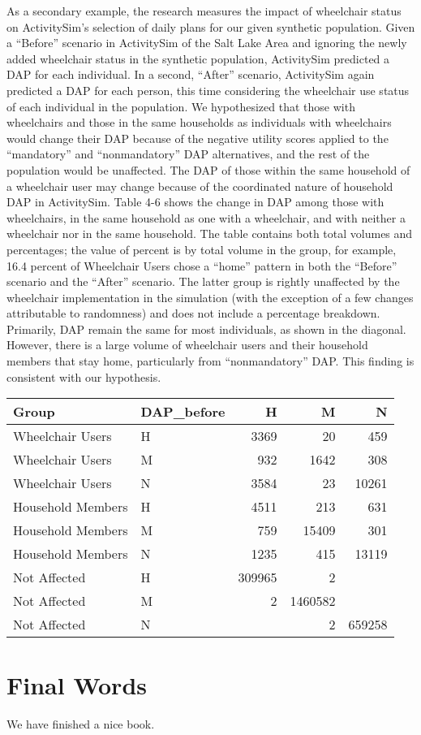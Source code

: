 \documentclass[3p, authoryear, review]{elsarticle} %
\begin{document}
As a secondary example, the research measures the impact of
wheelchair status on ActivitySim's selection of daily plans for our given
synthetic population. Given a ``Before'' scenario in ActivitySim of the Salt Lake
Area and ignoring the newly added wheelchair status in the synthetic population,
ActivitySim predicted a DAP for each individual. In a second, ``After'' scenario,
ActivitySim again predicted a DAP for each person, this time considering the
wheelchair use status of each individual in the population. We hypothesized that
those with wheelchairs and those in the same households as individuals with
wheelchairs would change their DAP because of the negative utility scores
applied to the ``mandatory'' and ``nonmandatory'' DAP alternatives, and the rest of
the population would be unaffected. The DAP of those within the same household
of a wheelchair user may change because of the coordinated nature of household
DAP in ActivitySim. Table 4-6 shows the change in DAP among those with
wheelchairs, in the same household as one with a wheelchair, and with neither a
wheelchair nor in the same household. The table contains both total volumes and
percentages; the value of percent is by total volume in the group, for example,
16.4 percent of Wheelchair Users chose a ``home'' pattern in both the ``Before''
scenario and the ``After'' scenario. The latter group is rightly unaffected by
the wheelchair implementation in the simulation (with the exception of a few
changes attributable to randomness) and does not include a percentage breakdown.
Primarily, DAP remain the same for most individuals, as shown in the diagonal.
However, there is a large volume of wheelchair users and their household members
that stay home, particularly from ``nonmandatory'' DAP. This finding is consistent
with our hypothesis.

\begin{table}
\centering
\begin{tabular}[t]{llrrr}
\toprule
Group & DAP\_before & H & M & N\\
\midrule
Wheelchair Users & H & 3369 & 20 & 459\\
Wheelchair Users & M & 932 & 1642 & 308\\
Wheelchair Users & N & 3584 & 23 & 10261\\
Household Members & H & 4511 & 213 & 631\\
Household Members & M & 759 & 15409 & 301\\
\addlinespace
Household Members & N & 1235 & 415 & 13119\\
Not Affected & H & 309965 & 2 & \\
Not Affected & M & 2 & 1460582 & \\
Not Affected & N &  & 2 & 659258\\
\bottomrule
\end{tabular}
\end{table}

\hypertarget{final-words}{%
\section{Final Words}\label{final-words}}

We have finished a nice book.


\end{document}
